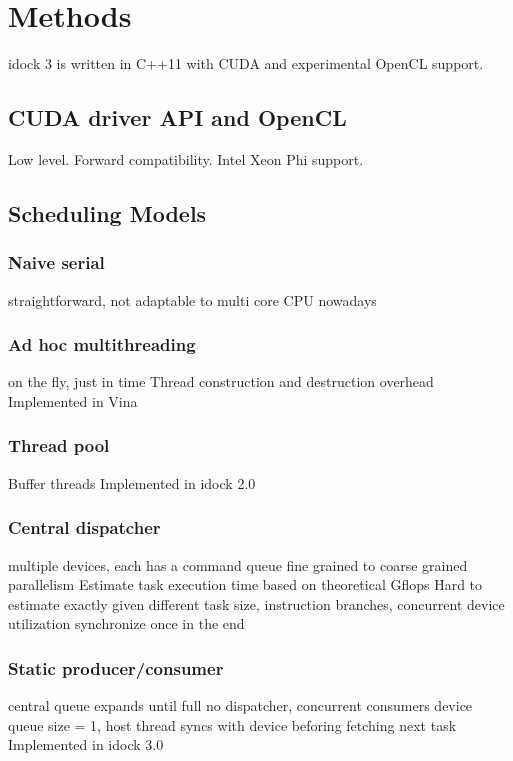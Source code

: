 \documentclass[10pt, conference, compsocconf]{../IEEEtran}
\begin{document}

\section{Methods}

idock 3 is written in C++11 with CUDA and experimental OpenCL support.

\subsection{CUDA driver API and OpenCL}

Low level. Forward compatibility. Intel Xeon Phi support.

\subsection{Scheduling Models}

\subsubsection{Naive serial}
straightforward, not adaptable to multi core CPU nowadays

\subsubsection{Ad hoc multithreading}
on the fly, just in time
Thread construction and destruction overhead
Implemented in Vina

\subsubsection{Thread pool}
Buffer threads
Implemented in idock 2.0

\subsubsection{Central dispatcher}
multiple devices, each has a command queue
fine grained to coarse grained parallelism
Estimate task execution time based on theoretical Gflops
Hard to estimate exactly given different task size, instruction branches, concurrent device utilization
synchronize once in the end

\subsubsection{Static producer/consumer}
central queue expands until full
no dispatcher, concurrent consumers
device queue size = 1, host thread syncs with device beforing fetching next task
Implemented in idock 3.0
\end{document}
